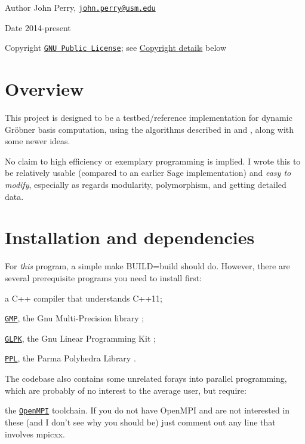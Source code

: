 \begin{DoxyAuthor}{Author}
John Perry, \href{mailto:john.perry@usm.edu}{\tt john.\+perry@usm.\+edu} 
\end{DoxyAuthor}
\begin{DoxyDate}{Date}
2014-\/present 
\end{DoxyDate}
\begin{DoxyCopyright}{Copyright}
\href{../../COPYING.txt}{\tt G\+NU Public License}; see \hyperlink{index_Copyright}{Copyright details} below
\end{DoxyCopyright}
\hypertarget{index_Overview}{}\section{Overview}\label{index_Overview}
This project is designed to be a testbed/reference implementation for dynamic Gr\"{o}bner basis computation, using the algorithms described in \cite{CaboaraDynAlg} and \cite{CaboaraPerry}, along with some newer ideas.

No claim to high efficiency or exemplary programming is implied. I wrote this to be relatively usable (compared to an earlier Sage implementation) and {\itshape easy to modify}, especially as regards modularity, polymorphism, and getting detailed data.\hypertarget{index_Install}{}\section{Installation and dependencies}\label{index_Install}
For {\itshape this} program, a simple {\ttfamily make B\+U\+I\+LD=build} should do. However, there are several prerequisite programs you need to install first\+:
\begin{DoxyItemize}
\item a C++ compiler that understands C++11;
\item \href{https://gmplib.org/}{\tt G\+MP}, the Gnu Multi-\/\+Precision library \cite{gmp};
\item \href{https://www.gnu.org/software/glpk/}{\tt G\+L\+PK}, the Gnu Linear Programming Kit \cite{glpk};
\item \href{http://bugseng.com/products/ppl}{\tt P\+PL}, the Parma Polyhedra Library \cite{BagnaraHZ08SCP}.
\end{DoxyItemize}

The codebase also contains some unrelated forays into parallel programming, which are probably of no interest to the average user, but require\+:
\begin{DoxyItemize}
\item the \href{https://www.open-mpi.org/}{\tt Open\+M\+PI} toolchain. If you do not have Open\+M\+PI and are not interested in these (and I don't see why you should be) just comment out any line that involves {\ttfamily mpicxx}.
\end{DoxyItemize}

